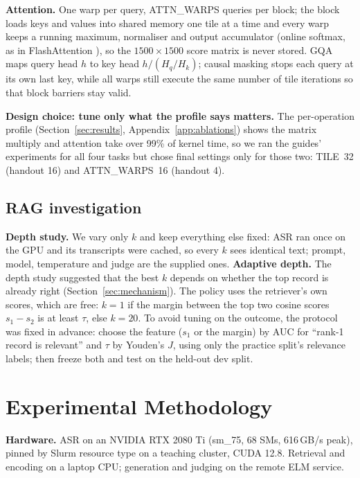 \documentclass{article}
\begin{document}
\textbf{Attention.} One warp per query, ATTN\_WARPS queries per block; the block loads keys and values into shared memory one tile at a time and every warp keeps a running maximum, normaliser and output accumulator (online softmax, as in FlashAttention \citep{dao2022flashattention}), so the $1500\times1500$ score matrix is never stored. GQA maps query head $h$ to key head $h/(H_q/H_k)$; causal masking stops each query at its own last key, while all warps still execute the same number of tile iterations so that block barriers stay valid.

\textbf{Design choice: tune only what the profile says matters.} The per-operation profile (Section~\ref{sec:results}, Appendix~\ref{app:ablations}) shows the matrix multiply and attention take over 99\% of kernel time, so we ran the guides' experiments for all four tasks but chose final settings only for those two: TILE~32 (handout 16) and ATTN\_WARPS~16 (handout 4).

\subsection{RAG investigation}
\textbf{Depth study.} We vary only $k$ and keep everything else fixed: ASR ran once on the GPU and its transcripts were cached, so every $k$ sees identical text; prompt, model, temperature and judge are the supplied ones. \textbf{Adaptive depth.} The depth study suggested that the best $k$ depends on whether the top record is already right (Section~\ref{sec:mechanism}). The policy uses the retriever's own scores, which are free: $k=1$ if the margin between the top two cosine scores $s_1-s_2$ is at least $\tau$, else $k=20$. To avoid tuning on the outcome, the protocol was fixed in advance: choose the feature ($s_1$ or the margin) by AUC for ``rank-1 record is relevant'' and $\tau$ by Youden's $J$, using only the practice split's relevance labels; then freeze both and test on the held-out dev split.

\section{Experimental Methodology}
\label{sec:methodology}

\textbf{Hardware.} ASR on an NVIDIA RTX 2080 Ti (sm\_75, 68 SMs, 616\,GB/s peak), pinned by Slurm resource type on a teaching cluster, CUDA 12.8. Retrieval and encoding on a laptop CPU; generation and judging on the remote ELM service.
\end{document}
